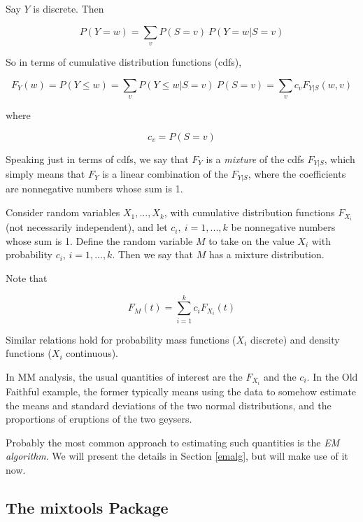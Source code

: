 \documentclass[11pt]{article}
\begin{document}
Say $Y$ is discrete.  Then

\begin{equation}
P(Y = w) = \sum_{v} P(S = v) ~ P(Y = w | S = v)
\end{equation}

So in terms of cumulative distribution functions (cdfs),

\begin{equation}
F_Y(w) = P(Y \leq w) = 
\sum_{v} P(Y \leq w | S = v) ~ P(S = v) =
\sum_{v} c_v F_{Y|S}(w,v)
\end{equation}

where 

\begin{equation}
c_v = P(S = v)
\end{equation}

Speaking just in terms of cdfs, we say that $F_Y$ is a \textit{mixture}
of the cdfs $F_{Y|S}$, which simply means that $F_Y$ is a linear
combination of the $F_{Y|S}$, where the coefficients are nonnegative
numbers whose sum is 1.



Consider random variables $X_1,...,X_k$, with cumulative distribution
functions $F_{X_i}$ (not necessarily independent), and let $c_i, ~
i=1,...,k$ be nonnegative numbers whose sum is 1.  Define the random
variable $M$ to take on the value $X_i$ with probability $c_i$,
$i=1,...,k$.  Then we say that $M$ has a mixture distribution.

Note that

\begin{equation}
F_{M}(t) = \sum_{i=1}^k c_i F_{X_i}(t)
\end{equation}

Similar relations hold for probability mass functions ($X_i$ discrete)
and density functions ($X_i$ continuous).

In MM analysis, the usual quantities of interest are the 
$F_{X_i}$ and the $c_i$.  In the Old Faithful example, the former 
typically means using the data to somehow estimate the means and
standard deviations of the two normal distributions, and the proportions
of eruptions of the two geysers.

Probably the most common approach to estimating such quantities is the
\textit{EM algorithm}.  We will present the details in Section
\ref{emalg}, but will make use of it now.

\subsection{The mixtools Package}
\end{document}
